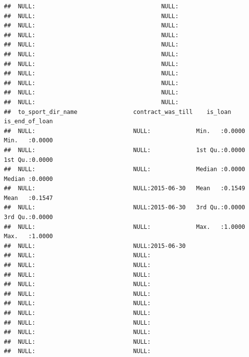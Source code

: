 \documentclass{article}\usepackage[]{graphicx}\usepackage[]{color}
\makeatletter
\newenvironment{kframe}{%
 \def\at@end@of@kframe{}%
 \ifinner\ifhmode%
  \def\at@end@of@kframe{\end{minipage}}%
  \begin{minipage}{\columnwidth}%
 \fi\fi%
 \def\FrameCommand##1{\hskip\@totalleftmargin \hskip-\fboxsep
 \colorbox{shadecolor}{##1}\hskip-\fboxsep
     \hskip-\linewidth \hskip-\@totalleftmargin \hskip\columnwidth}%
 \MakeFramed {\advance\hsize-\width
   \@totalleftmargin\z@ \linewidth\hsize
   \@setminipage}}%
 {\par\unskip\endMakeFramed%
 \at@end@of@kframe}
\newenvironment{knitrout}{}{} %
\makeatother
\begin{document}
\begin{knitrout}
\begin{kframe}
\begin{verbatim}
##  NULL:                                    NULL:                                 
##  NULL:                                    NULL:                                 
##  NULL:                                    NULL:                                 
##  NULL:                                    NULL:                                 
##  NULL:                                    NULL:                                 
##  NULL:                                    NULL:                                 
##  NULL:                                    NULL:                                 
##  NULL:                                    NULL:                                 
##  NULL:                                    NULL:                                 
##  NULL:                                    NULL:                                 
##  NULL:                                    NULL:                                 
##  to_sport_dir_name                contract_was_till    is_loan       is_end_of_loan  
##  NULL:                            NULL:             Min.   :0.0000   Min.   :0.0000  
##  NULL:                            NULL:             1st Qu.:0.0000   1st Qu.:0.0000  
##  NULL:                            NULL:             Median :0.0000   Median :0.0000  
##  NULL:                            NULL:2015-06-30   Mean   :0.1549   Mean   :0.1547  
##  NULL:                            NULL:2015-06-30   3rd Qu.:0.0000   3rd Qu.:0.0000  
##  NULL:                            NULL:             Max.   :1.0000   Max.   :1.0000  
##  NULL:                            NULL:2015-06-30                                    
##  NULL:                            NULL:                                              
##  NULL:                            NULL:                                              
##  NULL:                            NULL:                                              
##  NULL:                            NULL:                                              
##  NULL:                            NULL:                                              
##  NULL:                            NULL:                                              
##  NULL:                            NULL:                                              
##  NULL:                            NULL:                                              
##  NULL:                            NULL:                                              
##  NULL:                            NULL:                                              
##  NULL:                            NULL:                                              

\end{verbatim}
\end{kframe}
\end{knitrout}
\end{document}
